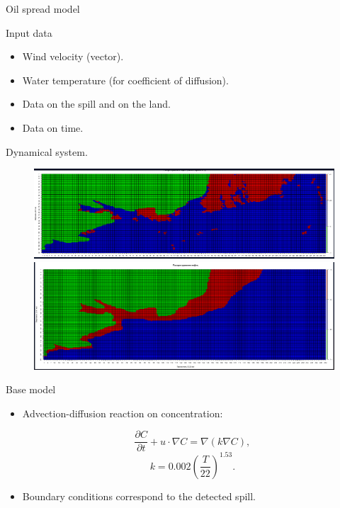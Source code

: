 \documentclass{beamer}
\begin{document}
\begin{section}{Oil spread model}
\begin{frame}{Input data}
\begin{itemize}
\item Wind velocity (vector).
\item Water temperature (for coefficient of diffusion).
\item Data on the spill and on the land.
\item Data on time.
\end{itemize}
Dynamical system.

\begin{figure}
	\centering
	\begin{minipage}{0.5\textwidth}
		\includegraphics[scale=0.2]{photo_before.png}
	\end{minipage}%
	\begin{minipage}{0.5\textwidth}
		\includegraphics[scale=0.2]{photo_after.png}
	\end{minipage}
\end{figure}

\end{frame}		
\begin{frame}{Base model}
\begin{itemize}
	\item Advection-diffusion reaction on concentration:
	
	$$\frac{\partial C}{\partial t} + u\cdot\nabla C = \nabla (k\nabla C),$$
	$$k = 0.002\left(\frac{T}{22}\right)^{1.53}.$$
	
	\item Boundary conditions correspond to the detected spill.
	

\end{itemize}
\end{frame}
\end{section}
\end{document}

